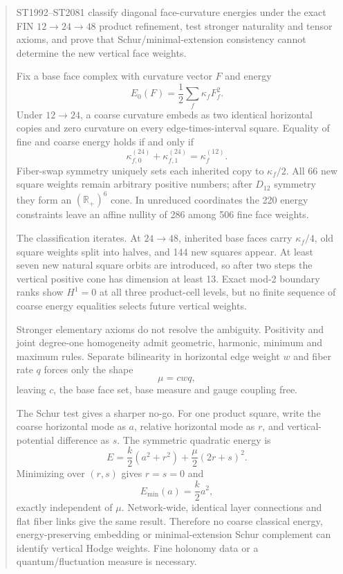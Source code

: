 \documentclass[11pt,a4paper]{article}
\begin{document}
\begin{abstract}
ST1992--ST2081 classify diagonal face-curvature energies under the exact FIN
$12\to24\to48$ product refinement, test stronger naturality and tensor axioms,
and prove that Schur/minimal-extension consistency cannot determine the new
vertical face weights.

Fix a base face complex with curvature vector $F$ and energy
\[
E_0(F)=\frac12\sum_f\kappa_fF_f^2.
\]
Under $12\to24$, a coarse curvature embeds as two identical horizontal copies
and zero curvature on every edge-times-interval square.  Equality of fine and
coarse energy holds if and only if
\[
\kappa_{f,0}^{(24)}+\kappa_{f,1}^{(24)}=\kappa_f^{(12)}.
\]
Fiber-swap symmetry uniquely sets each inherited copy to $\kappa_f/2$.  All 66
new square weights remain arbitrary positive numbers; after $D_{12}$ symmetry
they form an $(\mathbb R_+)^6$ cone.  In unreduced coordinates the 220 energy
constraints leave an affine nullity of 286 among 506 fine face weights.

The classification iterates.  At $24\to48$, inherited base faces carry
$\kappa_f/4$, old square weights split into halves, and 144 new squares appear.
At least seven new natural square orbits are introduced, so after two steps the
vertical positive cone has dimension at least 13.  Exact mod-2 boundary ranks
show $H^1=0$ at all three product-cell levels, but no finite sequence of coarse
energy equalities selects future vertical weights.

Stronger elementary axioms do not resolve the ambiguity.  Positivity and joint
degree-one homogeneity admit geometric, harmonic, minimum and maximum rules.
Separate bilinearity in horizontal edge weight $w$ and fiber rate $q$ forces
only the shape
\[
\mu=cwq,
\]
leaving $c$, the base face set, base measure and gauge coupling free.

The Schur test gives a sharper no-go.  For one product square, write the coarse
horizontal mode as $a$, relative horizontal mode as $r$, and vertical-potential
difference as $s$.  The symmetric quadratic energy is
\[
E=\frac{k}{2}(a^2+r^2)+\frac{\mu}{2}(2r+s)^2.
\]
Minimizing over $(r,s)$ gives $r=s=0$ and
\[
E_{\min}(a)=\frac{k}{2}a^2,
\]
exactly independent of $\mu$.  Network-wide, identical layer connections and
flat fiber links give the same result.  Therefore no coarse classical energy,
energy-preserving embedding or minimal-extension Schur complement can identify
vertical Hodge weights.  Fine holonomy data or a quantum/fluctuation measure is
necessary.


\end{abstract}
\end{document}
